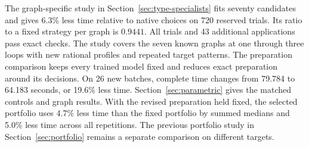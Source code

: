 \documentclass[11pt,a4paper]{article}
\begin{document}
The graph-specific study in Section~\ref{sec:type-specialists} fits
seventy candidates and gives 6.3\% less time relative to native choices
on 720 reserved trials. Its ratio to a fixed strategy per graph is
$0.9441$. All trials and 43 additional applications pass exact
checks. The study covers the seven known graphs at one through three
loops with new rational profiles and repeated target patterns.
The preparation comparison keeps every trained model fixed and reduces exact preparation around its decisions. On 26 new batches, complete time changes from 79.784 to 64.183 seconds, or 19.6\% less time. Section~\ref{sec:parametric} gives the matched controls and graph results. With the revised preparation held fixed, the selected portfolio uses 4.7\% less time than the fixed portfolio by summed medians and 5.0\% less time across all repetitions. The previous portfolio study in Section~\ref{sec:portfolio} remains a separate comparison on different targets.
\end{document}
